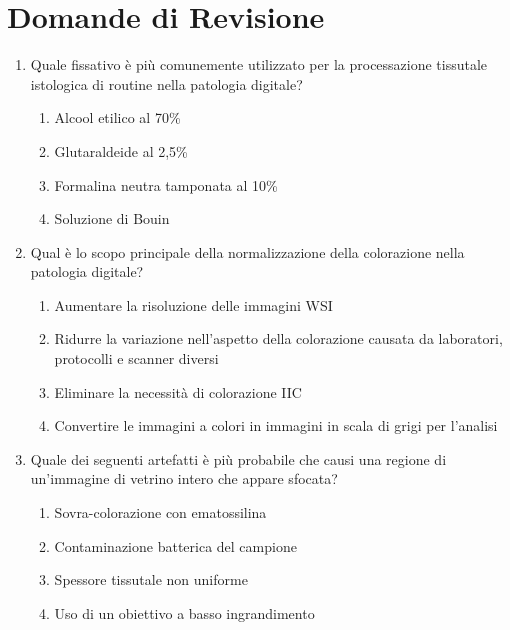 \section{Domande di Revisione}
\label{sec:ch2-questions}

\begin{enumerate}

    \item \label{ch2:q1} Quale fissativo è più comunemente utilizzato per la processazione
    tissutale istologica di routine nella patologia digitale?
    \begin{enumerate}[label=\Alph*.]
        \item Alcool etilico al 70\%
        \item Glutaraldeide al 2,5\%
        \item Formalina neutra tamponata al 10\%
        \item Soluzione di Bouin
    \end{enumerate}

    \item \label{ch2:q2} Qual è lo scopo principale della normalizzazione della colorazione nella
    patologia digitale?
    \begin{enumerate}[label=\Alph*.]
        \item Aumentare la risoluzione delle immagini WSI
        \item Ridurre la variazione nell'aspetto della colorazione causata da laboratori,
        protocolli e scanner diversi
        \item Eliminare la necessità di colorazione IIC
        \item Convertire le immagini a colori in immagini in scala di grigi per l'analisi
    \end{enumerate}

    \item \label{ch2:q3} Quale dei seguenti artefatti è più probabile che causi una regione di
    un'immagine di vetrino intero che appare sfocata?
    \begin{enumerate}[label=\Alph*.]
        \item Sovra-colorazione con ematossilina
        \item Contaminazione batterica del campione
        \item Spessore tissutale non uniforme
        \item Uso di un obiettivo a basso ingrandimento
    \end{enumerate}


\end{enumerate}
